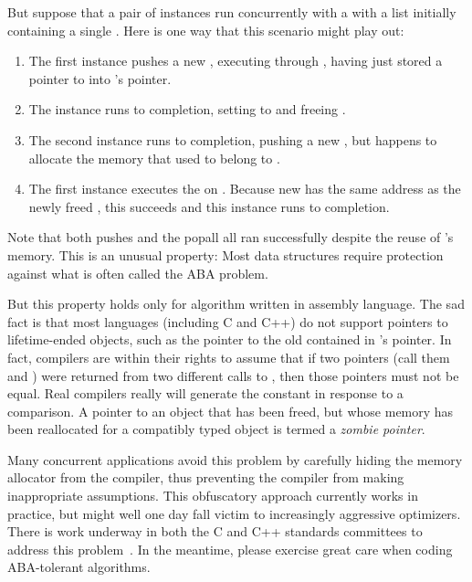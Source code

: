 \begin{fcvref}
But suppose that a pair of  instances run concurrently
with a  with a list initially containing a single
.
Here is one way that this scenario might play out:

\begin{enumerate}
\item	The first  instance pushes a new ,
	executing through , having just stored
	a pointer to  into 's  pointer.
\item	The  instance runs to completion,
	setting  to  and freeing .
\item	The second  instance runs to completion,
	pushing a new , but happens to allocate the memory
	that used to belong to .
\item	The first  instance executes the 
	on .
	Because new  has the same address as the newly freed ,
	this  succeeds and this  instance
	runs to completion.
\end{enumerate}

Note that both pushes and the popall all ran successfully despite the
reuse of 's memory.
This is an unusual property: Most data structures require protection
against what is often called the ABA problem.

But this property holds only for algorithm written in assembly
language.
The sad fact is that most languages (including C and C++) do not support
pointers to lifetime-ended objects, such as the pointer to the old 
contained in 's  pointer.
In fact, compilers are within their rights to assume that if two pointers
(call them  and ) were returned from two different calls to
, then those pointers must not be equal.
Real compilers really will generate the constant  in
response to a  comparison.
A pointer to an object that has been freed, but whose memory has been
reallocated for a compatibly typed object is termed a \emph{zombie pointer}.

Many concurrent applications avoid this problem by carefully hiding the
memory allocator from the compiler, thus preventing the compiler from
making inappropriate assumptions.
This obfuscatory approach currently works in practice, but might well
one day fall victim to increasingly aggressive optimizers.
There is work underway in both the C and C++ standards committees
to address this
problem~\cite{PaulEMcKenney2019PointerLifetimeEndZap,PaulEMcKenney2020PointerLifetimeEndZapCpp}.
In the meantime, please exercise great care when coding ABA-tolerant
algorithms.
\end{fcvref}

